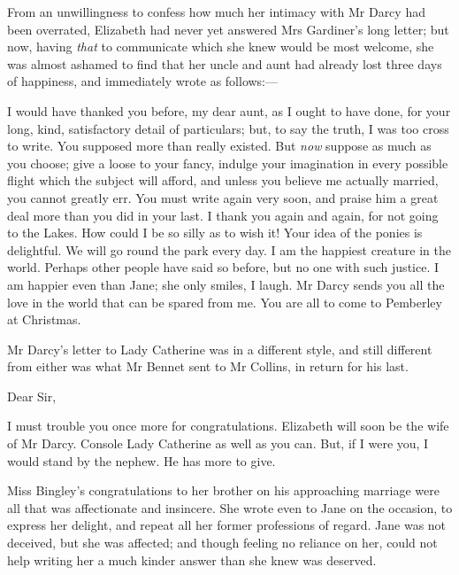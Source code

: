 From an unwillingness to confess how much her intimacy with Mr Darcy had been overrated, Elizabeth had never yet answered Mrs Gardiner's long letter; but now, having \textit{that} to communicate which she knew would be most welcome, she was almost ashamed to find that her uncle and aunt had already lost three days of happiness, and immediately wrote as follows:—

\begin{mail}{}{}

I would have thanked you before, my dear aunt, as I ought to have done, for your long, kind, satisfactory detail of particulars; but, to say the truth, I was too cross to write. You supposed more than really existed. But \textit{now} suppose as much as you choose; give a loose to your fancy, indulge your imagination in every possible flight which the subject will afford, and unless you believe me actually married, you cannot greatly err. You must write again very soon, and praise him a great deal more than you did in your last. I thank you again and again, for not going to the Lakes. How could I be so silly as to wish it! Your idea of the ponies is delightful. We will go round the park every day. I am the happiest creature in the world. Perhaps other people have said so before, but no one with such justice. I am happier even than Jane; she only smiles, I laugh. Mr Darcy sends you all the love in the world that can be spared from me. You are all to come to Pemberley at Christmas.

\end{mail}



Mr Darcy's letter to Lady Catherine was in a different style, and still different from either was what Mr Bennet sent to Mr Collins, in return for his last.

\begin{mail}{}{Dear Sir,}

I must trouble you once more for congratulations. Elizabeth will soon be the wife of Mr Darcy. Console Lady Catherine as well as you can. But, if I were you, I would stand by the nephew. He has more to give.

\end{mail}


Miss Bingley's congratulations to her brother on his approaching marriage were all that was affectionate and insincere. She wrote even to Jane on the occasion, to express her delight, and repeat all her former professions of regard. Jane was not deceived, but she was affected; and though feeling no reliance on her, could not help writing her a much kinder answer than she knew was deserved.

